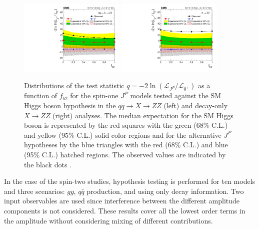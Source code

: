 \begin{figure}
  \centering
    \includegraphics[width=0.45\textwidth]{Spin_Parity/summary_PD.pdf}
    \includegraphics[width=0.45\textwidth]{Spin_Parity/summary_PI.pdf}
    \caption[Distributions of the test statistic $q=-2\ln(\mathcal{L}_{J^P}/\mathcal{L}_{0^+})$
    as a function of $f_{b2}$
      for the spin-one $J^{P}$ models tested against the SM Higgs boson hypothesis
      in the $q\bar{q} \to X \to ZZ$ (left) and decay-only $X \to ZZ$ (right) analyses.
      The median expectation for the SM Higgs boson is represented
      by the red squares with the green (68\% C.L.) and yellow (95\% C.L.) solid color regions and
       for the alternative $J^P$ hypotheses by the blue triangles
       with the red (68\% C.L.) and blue (95\% C.L.) hatched regions.
     The observed values are indicated by the black dot.]{Distributions of the test statistic $q=-2\ln(\mathcal{L}_{J^P}/\mathcal{L}_{0^+})$
    as a function of $f_{b2}$
      for the spin-one $J^{P}$ models tested against the SM Higgs boson hypothesis
      in the $q\bar{q} \to X \to ZZ$ (left) and decay-only $X \to ZZ$ (right) analyses.
      The median expectation for the SM Higgs boson is represented
      by the red squares with the green (68\% C.L.) and yellow (95\% C.L.) solid color regions and
       for the alternative $J^P$ hypotheses by the blue triangles
       with the red (68\% C.L.) and blue (95\% C.L.) hatched regions.
     The observed values are indicated by the black dots \cite{Khachatryan:2014kca}.
      \label{fig:jp_summary_1}
      }

\end{figure}


In the case of the spin-two studies, hypothesis testing is performed for ten models and three
scenarios: $gg$, $q\bar{q}$ production, and using only decay information. Two input observables
are used since interference between the different amplitude components is not considered.
These results cover all the lowest order terms in the amplitude without considering mixing of different contributions.

